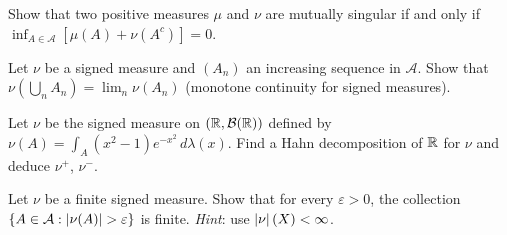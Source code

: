 \begin{exercise}
Show that two positive measures $\mu$ and $\nu$ are mutually singular if and only
if $\inf_{A \in \mathcal{A}} [\mu(A) + \nu(A^c)] = 0$.
\end{exercise}

\begin{exercise}
Let $\nu$ be a signed measure and $(A_n)$ an increasing sequence in $\mathcal{A}$.
Show that $\nu(\bigcup_n A_n) = \lim_n \nu(A_n)$ (monotone continuity for signed
measures).
\end{exercise}

\begin{exercise}
Let $\nu$ be the signed measure on $(\mathbb{R}, \mathcal{B}(\mathbb{R}))$ defined by
$\nu(A) = \int_A (x^2 - 1) e^{-x^2}\, d\lambda(x)$. Find a Hahn decomposition
of $\mathbb{R}$ for $\nu$ and deduce $\nu^+$, $\nu^-$.
\end{exercise}

\begin{exercise}
Let $\nu$ be a finite signed measure. Show that for every $\varepsilon > 0$, the
collection $\{A \in \mathcal{A} : \left| \nu(A) \right| > \varepsilon\}$ is finite.
\emph{Hint}: use $\left| \nu \right|(X) < \infty$.
\end{exercise}
